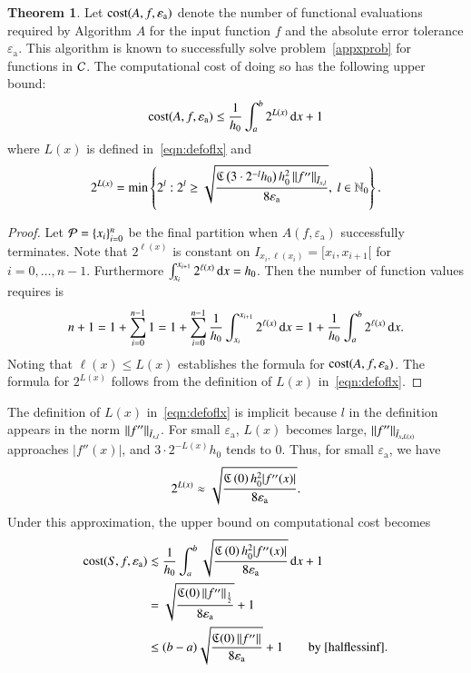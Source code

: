 \documentclass[review]{elsarticle}
\newcommand{\abstol}{\varepsilon_{\textrm{a}}}
\theoremstyle{definition}
\newtheorem{theorem}{Theorem}
\begin{document}
\begin{theorem}\label{thm:cost}
Let $\cost(A,f,\abstol)$ denote the number of functional evaluations required by Algorithm $A$ for the input function $f$ and the absolute error tolerance $\abstol$.  This algorithm is known to successfully solve problem~\eqref{appxprob} for functions in $\cc$.  The computational cost of doing so has the following upper bound:
\begin{equation*}
\cost(A,f,\abstol) \le \frac{1}{h_0}\int_a^b 2^{L(x)} \, \dif x +1 \\
\end{equation*}
where $L(x)$ is defined in~\eqref{eqn:defoflx} and
\begin{equation*}
2^{L(x)} = \min\left\{2^l:  2^l \ge \sqrt{\frac{\fC\left(3\cdot 2^{-l} h_0\right) h_0^2 \norm[\bar{I}_{x,l}]{f''} }{8 \abstol}}, \  l \in  \natzero\right\}.
\end{equation*}
\end{theorem}

\begin{proof}
Let $\cp=\{x_i\}_{i=0}^n$ be the final partition when $A(f,\abstol)$ successfully terminates. Note that $2^{\ell(x)}$ is constant on $I_{x_i,\ell(x_i)} = [x_{i},x_{i+1}[$ for $i=0, \ldots, n-1$.  Furthermore  $\int_{x_i}^{x_{i+1}} 2^{\ell(x)} \, \dif  x =  h_0$.  Then the number of function values requires is
\begin{equation*}
n+1 = 1 + \sum_{i=0}^{n-1} 1 = 1 + \sum_{i=0}^{n-1} \frac{1}{h_0} \int_{x_i}^{x_{i+1}} 2^{\ell(x)} \, \dif  x = 1 + \frac{1}{h_0}\int_a^b 2^{\ell(x)} \, \dif x.
\end{equation*}
Noting that $\ell(x) \le L(x)$ establishes the formula for $\cost(A,f,\abstol)$.  The formula for $2^{L(x)}$ follows from the definition of $L(x)$
in~\eqref{eqn:defoflx}.
\end{proof}

The definition of $L(x)$ in~\eqref{eqn:defoflx} is implicit because $l$ in the definition appears in the norm $\norm[\bar{I}_{x,l}]{f''}$.  For small $\abstol$, $L(x)$ becomes large,  $\norm[\bar{I}_{x,L(x)}]{f''}$ approaches $|f''(x)|$, and $3\cdot 2^{-L(x)}h_0$ tends to $0$.  Thus, for small $\abstol$, we have
$$ 2^{L(x)} \approx \sqrt{\frac{\fC\left(0\right)  h_0^2 |f''(x)|}{8\abstol}}.$$
Under this approximation, the upper bound on computational cost becomes
\begin{align}
\nonumber
\cost(S,f,\abstol)  &\lesssim \frac{1}{h_0}\int_a^b \sqrt{\frac{\fC\left(0\right)  h_0^2 |f''(x)|}{8\abstol}} \, \dif x +1 \\
& =\sqrt{\frac{\fC(0) \norm[\frac 12]{f''}}{8\abstol}} +1 \label{costbdapprox} \\
& \le (b-a)\sqrt{\frac{\fC(0) \norm{f''}}{8\abstol}} +1 \label{costbdinf}  \qquad \text{by \eqref{halflessinf}}.
\end{align}
\end{document}
